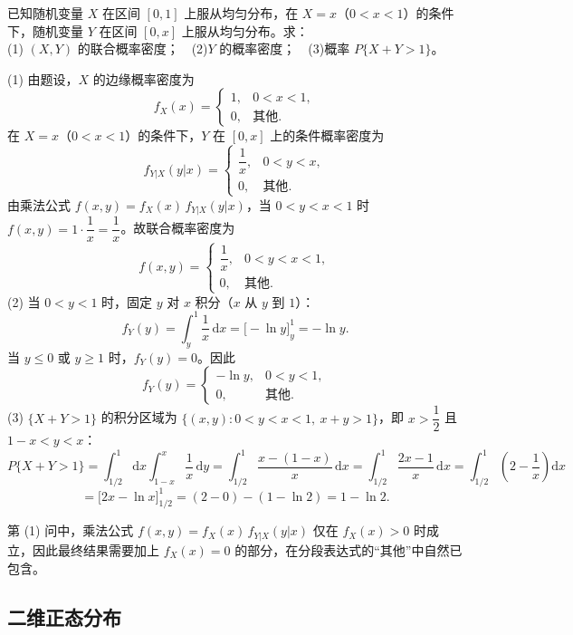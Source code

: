 ﻿\documentclass[lang=cn,11pt]{elegantbook}
\begin{document}
\begin{exercise}[条件均匀分布] \label{exer:3-14}
已知随机变量 $X$ 在区间 $[0,1]$ 上服从均匀分布，在 $X=x$（$0<x<1$）的条件下，随机变量 $Y$ 在区间 $[0,x]$ 上服从均匀分布。求：\\
(1) $(X,Y)$ 的联合概率密度；~~(2)$Y$ 的概率密度；~~(3)概率 $P\{X+Y>1\}$。
\end{exercise}
\begin{solution}
(1) 由题设，$X$ 的边缘概率密度为
\[
f_X(x) = \begin{cases} 1, & 0 < x < 1, \\ 0, & \text{其他}. \end{cases}
\]
在 $X=x$（$0<x<1$）的条件下，$Y$ 在 $[0,x]$ 上的条件概率密度为
\[
f_{Y|X}(y|x) = \begin{cases} \dfrac{1}{x}, & 0 < y < x, \\ 0, & \text{其他}. \end{cases}
\]
由乘法公式 $f(x,y) = f_X(x)\,f_{Y|X}(y|x)$，当 $0<y<x<1$ 时 $f(x,y) = 1\cdot\dfrac{1}{x} = \dfrac{1}{x}$。故联合概率密度为
\[
f(x,y) = \begin{cases} \dfrac{1}{x}, & 0 < y < x < 1, \\ 0, & \text{其他}. \end{cases}
\]
(2) 当 $0<y<1$ 时，固定 $y$ 对 $x$ 积分（$x$ 从 $y$ 到 $1$）：
\[
f_Y(y) = \int_y^1\frac{1}{x}\,\mathrm{d}x = \bigl[-\ln y\bigr]_y^1 = -\ln y.
\]
当 $y \leqslant 0$ 或 $y \geqslant 1$ 时，$f_Y(y) = 0$。因此
\[
f_Y(y) = \begin{cases} -\ln y, & 0 < y < 1, \\ 0, & \text{其他}. \end{cases}
\]
(3) $\{X+Y>1\}$ 的积分区域为 $\{(x,y): 0<y<x<1,\ x+y>1\}$，即 $x>\dfrac{1}{2}$ 且 $1-x<y<x$：
\[
P\{X+Y>1\} = \int_{1/2}^1\mathrm{d}x\int_{1-x}^x\frac{1}{x}\,\mathrm{d}y = \int_{1/2}^1\frac{x-(1-x)}{x}\,\mathrm{d}x = \int_{1/2}^1\frac{2x-1}{x}\,\mathrm{d}x = \int_{1/2}^1\left(2-\frac{1}{x}\right)\mathrm{d}x
\]
\[
= \bigl[2x - \ln x\bigr]_{1/2}^1 = (2-0) - (1-\ln 2) = 1 - \ln 2.
\]
\end{solution}
\begin{note}
第 (1) 问中，乘法公式 $f(x,y) = f_X(x)\,f_{Y|X}(y|x)$ 仅在 $f_X(x)>0$ 时成立，因此最终结果需要加上 $f_X(x)=0$ 的部分，在分段表达式的``其他''中自然已包含。
\end{note}


\subsection{二维正态分布}
\end{document}
